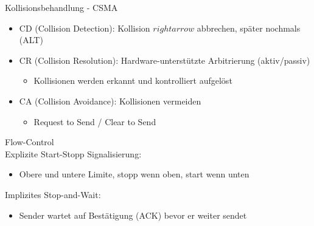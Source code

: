 \begin{concept}{Kollisionsbehandlung - CSMA}
    \begin{itemize}
        \item CD (Collision Detection): Kollision $rightarrow$ abbrechen, später nochmals (ALT)
        \item CR (Collision Resolution): Hardware-unterstützte Arbitrierung (aktiv/passiv)
        \begin{itemize}
            \item Kollisionen werden erkannt und kontrolliert aufgelöst
        \end{itemize}
        \item CA (Collision Avoidance): Kollisionen vermeiden
        \begin{itemize}
            \item Request to Send / Clear to Send
        \end{itemize}
    \end{itemize}
\end{concept}

\begin{concept}{Flow-Control}\\
    Explizite Start-Stopp Signalisierung:
    \begin{itemize}
        \item Obere und untere Limite, stopp wenn oben, start wenn unten
    \end{itemize}
    Implizites Stop-and-Wait:
    \begin{itemize}
        \item Sender wartet auf Bestätigung (ACK) bevor er weiter sendet
    \end{itemize}
\end{concept}